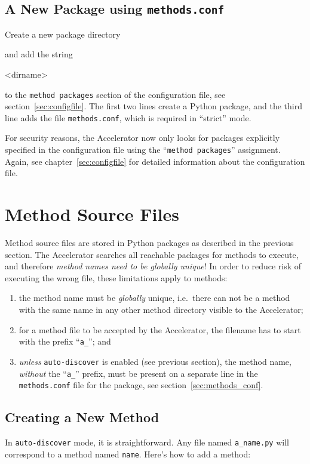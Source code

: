 \subsection{A New Package using \texttt{methods.conf}}
Create a new package directory
\begin{shell}
\end{shell}
and add the string
\begin{shell}
<dirname>
\end{shell}
to the \texttt{method packages} section of the
configuration file, see section~\ref{sec:configfile}.  The first two
lines create a Python package, and the third line adds the
file \texttt{methods.conf}, which is required in ``strict'' mode.

For security reasons, the Accelerator now only looks for packages
explicitly specified in the configuration file using the
``\texttt{method packages}'' assignment.  Again, see
chapter~\ref{sec:configfile} for detailed information about the
configuration file.



\section{Method Source Files}
Method source files are stored in Python packages as described in the
previous section.  The Accelerator searches all reachable packages for
methods to execute, and therefore \textsl{method names need to be
globally unique}!  In order to reduce risk of executing the wrong
file, these limitations apply to methods:
\begin{enumerate}
\item the method name must be \emph{globally} unique, i.e.\ there can
  not be a method with the same name in any other method directory
  visible to the Accelerator;
\item for a method file to be accepted by the Accelerator, the
  filename has to start with the prefix ``\texttt{a\_}''; and
\item \textsl{unless} \texttt{auto-discover} is enabled (see previous section),
  the method name, \textsl{without} the ``\texttt{a\_}'' prefix, must be present on a
  separate line in the \texttt{methods.conf} file for the package, see
  section~\ref{sec:methods_conf}.
\end{enumerate}


\subsection{Creating a New Method}
In \texttt{auto-discover} mode, it is straightforward.  Any file named
\texttt{a\_name.py} will correspond to a method named \texttt{name}.
Here's how to add a method:

